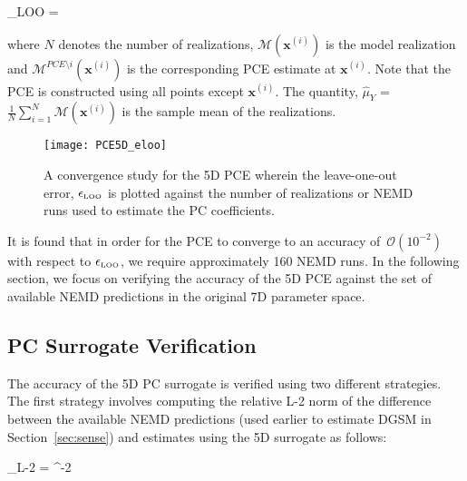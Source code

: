\be
\epsilon_{\tiny{\mbox{LOO}}} = 
\label{eq:loo}
\ee 

\noindent where $N$ denotes the number of realizations, $\mathcal{M}(\bm{x}^{(i)})$ is the
model realization and $\mathcal{M}^{PCE\setminus i}(\bm{x}^{(i)})$ is the corresponding PCE estimate
at $\bm{x}^{(i)}$. Note that the PCE is constructed using all points except $\bm{x}^{(i)}$.
The quantity, $\hat{\mu}_Y$ = $\frac{1}{N}\sum\limits_{i=1}^{N}\mathcal{M}(\bm{x}^{(i)})$
is the sample mean of the realizations.

\begin{figure}[htbp]
 \begin{center}
  \texttt{[image: PCE5D\_eloo]}
\caption{A convergence study for the 5D PCE wherein the leave-one-out
error, $\epsilon_{\tiny{\mbox{LOO}}}$ is plotted against the number of
realizations or NEMD runs used to estimate the PC coefficients.}
\label{fig:loo}
\end{center}
\end{figure}
 
It is found that in order for the PCE to converge to an accuracy of~$\mathcal{O}(10^{-2})$
with respect to $\epsilon_{\tiny{\mbox{LOO}}}$, we require approximately 160 NEMD runs. In the
following section, we focus on verifying the accuracy of the 5D PCE against the set of available
NEMD predictions in the original 7D parameter space. 

\subsection{PC Surrogate Verification}

The accuracy of the 5D PC surrogate is verified using two different strategies. The first strategy involves
computing the relative L-2 norm of the difference between the available NEMD predictions (used earlier
to estimate DGSM in Section~\ref{sec:sense}) and estimates using the 5D surrogate as follows:

\be
\epsilon_{\mbox{\tiny{L-2}}} = 
 ^{-2}
\ee
 
